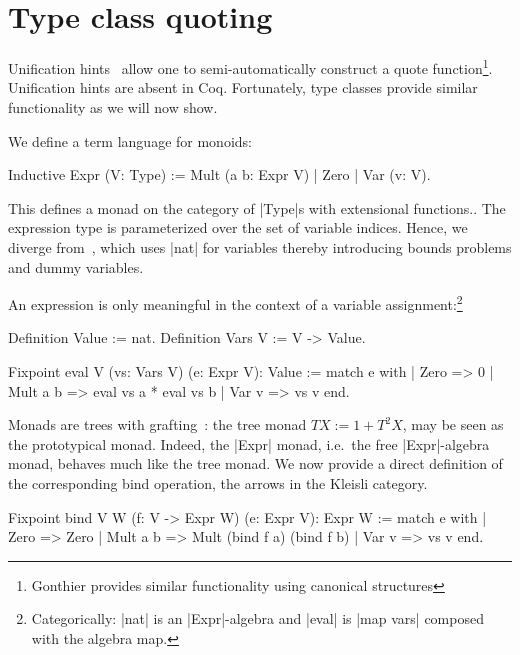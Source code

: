 \documentclass[a4paper,10pt, runningheads]{llncs}
\begin{document}

\section{Type class quoting}\label{quote}
Unification hints~\cite{Hints} allow one to semi-automatically construct a quote
function\footnote{Gonthier provides similar functionality using canonical structures}.
Unification hints are absent in Coq. Fortunately, type classes provide similar functionality as
we will now show.

We define a term language for monoids:
\begin{code}
Inductive Expr (V: Type) := Mult (a b: Expr V) | Zero | Var (v: V).
\end{code}
This defines a monad on the category of |Type|s with extensional functions..
The expression type is parameterized over the set of variable indices. Hence, we diverge
 from~\cite{Hints}, which uses |nat| for variables thereby introducing bounds problems and
 dummy variables.

\noindent An expression is only meaningful in the context of a variable
assignment:\footnote{Categorically: |nat| is
an |Expr|-algebra and |eval| is |map vars| composed with the algebra map.}
\begin{code}
Definition Value := nat.
Definition Vars V := V -> Value.

Fixpoint eval {V} (vs: Vars V) (e: Expr V): Value :=
  match e with
  | Zero => 0
  | Mult a b => eval vs a * eval vs b
  | Var v => vs v
  end.
\end{code}
%
Monads are trees with grafting~\cite{MonadsGrafting}: the tree monad
$TX:=1+T^2X$, may be seen as the prototypical monad. Indeed, the |Expr| monad, i.e.\ the free
|Expr|-algebra monad, behaves much like the tree monad. We now provide a direct definition of the
corresponding bind operation, the arrows in the Kleisli category.

\begin{code}
Fixpoint bind {V W} (f: V -> Expr W) (e: Expr V): Expr W :=
  match e with
  | Zero => Zero
  | Mult a b => Mult (bind f a) (bind f b)
  | Var v => vs v
  end.
\end{code}
\end{document}
